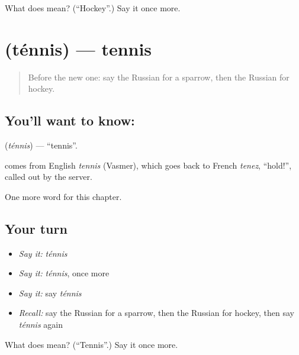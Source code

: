 \begin{tcolorbox}[breakable,colback=teal!4,colframe=teal!35!black,title={Before you move on}]
What does  mean? (\textquotedblleft{}Hockey\textquotedblright{}.) Say it once more.
\end{tcolorbox}
\section[\texorpdfstring{\ru{теннис} (ténnis)}{теннис (ténnis)}]{ (ténnis) — tennis}

\label{lesson:RU-C252-tennis}



\begin{quote}
Before the new one: say the Russian for a sparrow, then the Russian for hockey.
\end{quote}

\subsection*{You'll want to know: }
\textbf{} (\emph{ténnis}) — \textquotedblleft{}tennis\textquotedblright{}.

\begin{cousinweb}
\textbf{} comes from English \emph{tennis} (Vasmer), which goes back to French \emph{tenez}, \textquotedblleft{}hold!\textquotedblright{}, called out by the server.
\end{cousinweb}

\begin{grammarlens}[title={What you've built}]
One more word for this chapter.
\end{grammarlens}

\subsection*{Your turn}
\begin{itemize}
\raggedright
  \item \emph{Say it:} \emph{ténnis}
  \item \emph{Say it:} \emph{ténnis}, once more
  \item \emph{Say it:} say \emph{ténnis}
  \item \emph{Recall:} say the Russian for a sparrow, then the Russian for hockey, then say \emph{ténnis} again
\end{itemize}

\begin{tcolorbox}[breakable,colback=teal!4,colframe=teal!35!black,title={Before you move on}]
What does  mean? (\textquotedblleft{}Tennis\textquotedblright{}.) Say it once more.
\end{tcolorbox}
